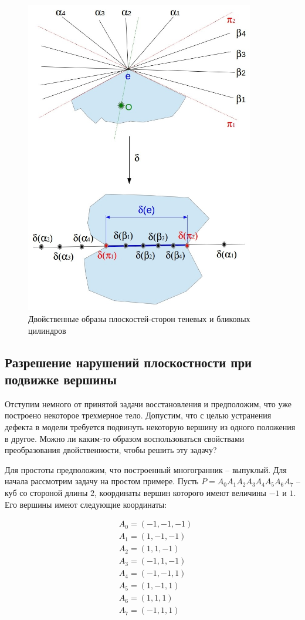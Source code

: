 \documentclass[a4paper, 12pt, titlepage]{article}
\theoremstyle{definition}
\theoremstyle{plain}
\theoremstyle{plain}
\begin{document}
\begin{figure}[ht]
 \includegraphics[width=10cm]{images/DualShadowBlinkSides.jpg}
 \caption{Двойственные образы плоскостей-сторон теневых и бликовых цилиндров}
 \label{DualShadowBlinkSides}
\end{figure}

\newpage
\subsection{Разрешение нарушений плоскостности при подвижке вершины}

Отступим немного от принятой задачи восстановления и предположим, что уже
построено некоторое трехмерное тело. Допустим, что с целью устранения дефекта в
модели требуется подвинуть некоторую вершину из одного положения в другое.
Можно ли каким-то образом воспользоваться свойствами преобразования
двойственности, чтобы решить эту задачу?

Для простоты предположим, что построенный многогранник -- выпуклый. Для начала
рассмотрим задачу на простом примере. Пусть
$P = A_{0} A_{1} A_{2} A_{3} A_{4} A_{5} A_{6} A_{7}$ -- куб со
стороной длины $2$, координаты вершин которого имеют величины $-1$ и $1$. Его
вершины имеют следующие координаты:

\begin{align*}
 & A_{0} = (-1, -1, -1) \\ & A_{1} = (1, -1, -1) \\
 & A_{2} = (1, 1, -1)   \\ & A_{3} = (-1, 1, -1) \\
 & A_{4} = (-1, -1, 1)  \\ & A_{5} = (1, -1, 1)  \\
 & A_{6} = (1, 1, 1)    \\ & A_{7} = (-1, 1, 1)
\end{align*}
\end{document}

